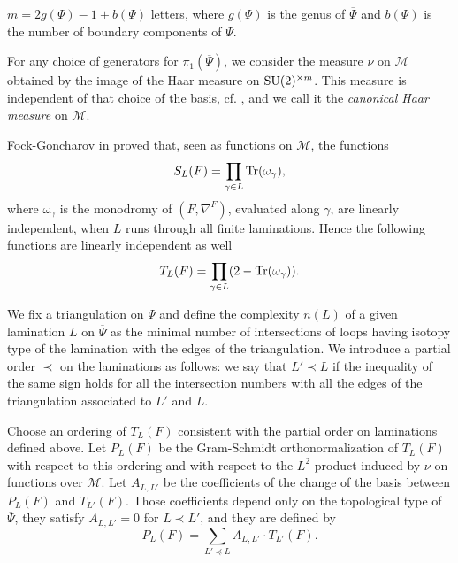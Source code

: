\documentclass[12pt]{article}
\numberwithin{equation}{section}
\theoremstyle{theorem}
\theoremstyle{definition}
\theoremstyle{remark}
\begin{document}
$m = 2g(\Psi)-1+b(\Psi)$ letters, where $g(\Psi)$ is the genus of $\overline{\Psi}$ and $b(\Psi)$ is the number of boundary components of $\Psi$. 
	\par 
	For any choice of generators for $\pi_1(\overline{\Psi})$, we consider the measure $\nu$ on $\mathcal{M}$ obtained by the image of the Haar measure on ${\rm{SU}}(2)^{\times m}$. 
	This measure is independent of that choice of the basis, cf. \cite[end of \S 4.5.1]{KassKenyon}, and we call it the \textit{canonical Haar measure} on $\mathcal{M}$. 
	\par Fock-Goncharov in \cite[Theorem 12.3]{FockGonch} proved that, seen as functions on $\mathcal{M}$, the functions 
	\begin{equation}\label{eq_defn_sl}
	S_L(F) = \prod_{\gamma \in L} {\rm{Tr}}(\omega_{\gamma}),
	\end{equation}
	where $\omega_{\gamma}$ is the monodromy of $(F, \nabla^F)$, evaluated along $\gamma$, are linearly independent, when $L$ runs through all finite laminations. 
	Hence the following functions are linearly independent as well
	\begin{equation}\label{eq_defn_tl}
		T_L(F) =\prod_{\gamma \in L} (2 - {\rm{Tr}}(\omega_{\gamma})).
	\end{equation}
	\par We fix a triangulation on $\Psi$ and define the complexity $n(L)$ of a given lamination $L$ on $\overline{\Psi}$ as the minimal number of intersections of loops having isotopy type of the lamination with the edges of the triangulation. We introduce a partial order $\prec$ on the laminations as follows: we say that $L' \prec L$ if the inequality of the same sign holds for all the intersection numbers with all the edges of the triangulation associated to $L'$ and $L$. 
	\par 
	Choose an ordering of $T_L(F)$ consistent with the partial order on laminations defined above. 
	Let $P_L(F)$ be the Gram-Schmidt orthonormalization of $T_L(F)$ with respect to this ordering and with respect to the $L^2$-product induced by $\nu$ on functions over $\mathcal{M}$.
	Let $A_{L,L'}$ be the coefficients of the change of the basis between $P_L(F)$ and $T_{L'}(F)$.
	Those coefficients depend only on the topological type of $\overline{\Psi}$, they satisfy $A_{L, L'} = 0$ for $L \prec L'$, and they are defined by
	\begin{equation}\label{eq_allprim_defn}
		P_L(F) = \sum_{L' \preceq L} A_{L, L'} \cdot T_{L'}(F).
	\end{equation}
\end{document}
